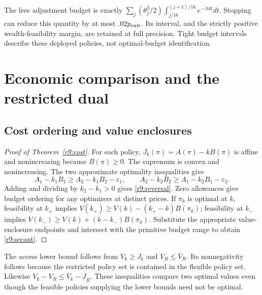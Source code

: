 The free adjustment budget is exactly $\sum_j(\theta_j^2/2)\int_{j/16}^{(j+1)/16}e^{-.04t}dt$. Stopping can reduce this quantity by at most $.02p_{\rm exit}$. Its interval, and the strictly positive wealth-feasibility margin, are retained at full precision. Tight budget intervals describe these deployed policies, not optimal-budget identification.

\section{Economic comparison and the restricted dual}\label{r9:proof:dual}
\subsection{Cost ordering and value enclosures}
\begin{proof}[Proof of Theorem~\ref{r9:cost}]
For each policy, $J_k(\pi)=A(\pi)-kB(\pi)$ is affine and nonincreasing because $B(\pi)\geq0$. The supremum is convex and nonincreasing. The two approximate optimality inequalities give
\[
 A_1-k_1B_1\geq A_2-k_1B_2-\varepsilon_1,
 \qquad A_2-k_2B_2\geq A_1-k_2B_1-\varepsilon_2.
\]
Adding and dividing by $k_2-k_1>0$ gives \eqref{r9:reversal}. Zero allowances give budget ordering for any optimizers at distinct prices. If $\pi_k$ is optimal at $k$, feasibility at $k_+$ implies $V(k_+)\geq V(k)-(k_+-k)B(\pi_k)$; feasibility at $k_-$ implies $V(k_-)\geq V(k)+(k-k_-)B(\pi_k)$. Substitute the appropriate value-enclosure endpoints and intersect with the primitive budget range to obtain \eqref{r9:secant}.
\end{proof}
The access lower bound follows from $V_k\geq J_k$ and $V_R\leq\overline V_R$. Its nonnegativity follows because the restricted policy set is contained in the flexible policy set. Likewise $V_k-V_R\leq\overline V_k-\underline J_R$. These inequalities compare two optimal values even though the feasible policies supplying the lower bounds need not be optimal.

